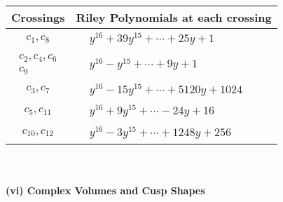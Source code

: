 \documentclass[1p]{elsarticle_modified}
\theoremstyle{definition}
\begin{document}
\begin{tabular}{m{50pt}|m{274pt}}
Crossings & \hspace{64pt}Riley Polynomials at each crossing \\
\hline $$\begin{aligned}c_{1},c_{8}\end{aligned}$$&$\begin{aligned}
&y^{16}+39 y^{15}+\cdots+25 y+1
\end{aligned}$\\
\hline $$\begin{aligned}c_{2},c_{4},c_{6}\\c_{9}\end{aligned}$$&$\begin{aligned}
&y^{16}- y^{15}+\cdots+9 y+1
\end{aligned}$\\
\hline $$\begin{aligned}c_{3},c_{7}\end{aligned}$$&$\begin{aligned}
&y^{16}-15 y^{15}+\cdots+5120 y+1024
\end{aligned}$\\
\hline $$\begin{aligned}c_{5},c_{11}\end{aligned}$$&$\begin{aligned}
&y^{16}+9 y^{15}+\cdots-24 y+16
\end{aligned}$\\
\hline $$\begin{aligned}c_{10},c_{12}\end{aligned}$$&$\begin{aligned}
&y^{16}-3 y^{15}+\cdots+1248 y+256
\end{aligned}$\\
\hline
\end{tabular}\\~\\
\newpage\flushleft \textbf{(vi) Complex Volumes and Cusp Shapes}
\end{document}
